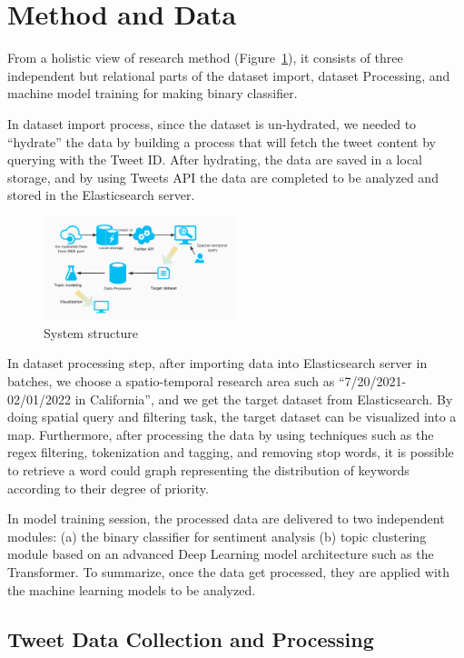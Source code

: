 \section{Method and Data} 
\label{sec:method}
From a holistic view of research method (Figure~\ref{fig:Research Method}), it
consists of three independent but relational parts of the dataset import,
dataset Processing, and machine model training for making binary classifier.

In dataset import process, since the dataset is un-hydrated, we needed
to “hydrate” the data by building a process that will fetch the tweet content
by querying with the Tweet ID. After hydrating, the data are saved in a local
storage, and by using Tweets API the data are completed to be analyzed and
stored in the Elasticsearch server. 
\begin{figure}[h]
\centering
\includegraphics[width=0.5\textwidth]{imgs/freamwork.jpg}
\caption{System structure}
\label{fig:Research Method}
\end{figure}
In dataset processing step, after importing data into Elasticsearch server in
batches, we choose a spatio-temporal research area such
as “7/20/2021-02/01/2022 in California”, and we get the target dataset from
Elasticsearch. By doing spatial query and filtering task, the target dataset
can be visualized into a map. Furthermore, after processing the data by using
techniques such as the regex filtering, tokenization and tagging, and
removing stop words, it is possible to retrieve a word could graph
representing the distribution of keywords according to their degree of
priority.

In model training session, the processed data are delivered to two independent
modules: (a) the binary classifier for sentiment analysis (b) topic
clustering module based on an advanced Deep Learning model architecture such
as the Transformer. To summarize, once the data get processed, they are
applied with the machine learning models to be analyzed.

\subsection{Tweet Data Collection and Processing}
